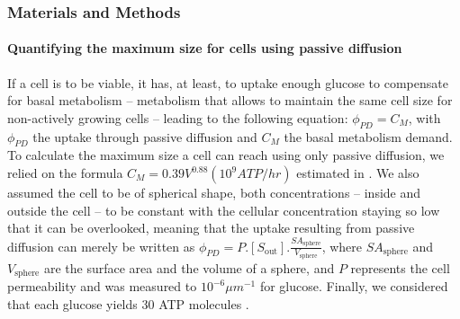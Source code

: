 
\subsubsection{Materials and Methods\label{sec:M&M}}





\noindent \paragraph{Quantifying the maximum size for cells using passive diffusion}

If a cell is to be viable, it has, at least, to uptake enough glucose to compensate for basal metabolism -- metabolism that allows to maintain the same cell size for non-actively growing cells \citep{Lynch15} -- leading to the following equation: $\phi_{PD}=C_M$, with $\phi_{PD}$ the uptake through passive diffusion and $C_M$ the basal metabolism demand. To calculate the maximum size a cell can reach using only passive diffusion, we relied on the formula $C_M=0.39V^{0.88} (10^9 ATP/hr)$ estimated in \citep{Lynch15}. We also assumed the cell to be of spherical shape, both concentrations -- inside and outside the cell -- to be constant with the cellular concentration staying so low that it can be overlooked, meaning that the uptake resulting from passive diffusion can merely be written as $\phi_{PD}=P.[S_{\text{out}}].\frac{SA_{\text{sphere}}}{V_{\text{sphere}}}$, where $SA_{\text{sphere}}$ and $V_{\text{sphere}}$ are the surface area and the volume of a sphere, and $P$ represents the cell permeability and was measured to $10^{-6}\mu m^{-1}$ \citep{Wood68} for glucose. Finally, we considered that each glucose yields 30 ATP molecules \citep{Rich03}. 

